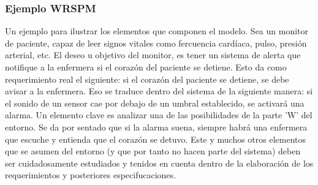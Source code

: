 \subsubsection{Ejemplo WRSPM} Un ejemplo para ilustrar los elementos que componen el modelo. Sea un monitor de paciente, capaz de leer signos vitales como fercuencia cardíaca, pulso, presión arterial, etc. El deseo u objetivo del monitor, es tener un sistema de alerta que notifique a la enfermera si el corazón del paciente se detiene. Esto da como requerimiento real el siguiente: si el corazón del paciente se detiene, se debe avisar a la enfermera. Eso se traduce dentro del sistema de la siguiente manera: si el sonido de un sensor cae por debajo de un umbral establecido, se activará una alarma. Un elemento clave es analizar una de las posibilidades de la parte 'W' del entorno. Se da por sentado que si la alarma suena, siempre habrá una enfermera que escuche y entienda que el corazón se detuvo. Este y muchos otros elementos que se asumen del entorno (y que por tanto no hacen parte del sistema) deben ser cuidadosamente estudiados y tenidos en cuenta dentro de la elaboración de los requerimientos y posteriores especifucaciones.  